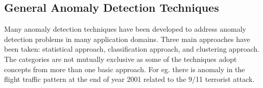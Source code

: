 \subsection{General Anomaly Detection Techniques}
Many anomaly detection techniques have been developed to address anomaly detection problems in many application domains. Three main approaches have been taken: statistical approach, classification approach, and clustering approach. The categories are not mutually exclusive as some of the techniques adopt concepts from more than one basic approach. 
For eg. there is anomaly in the flight traffic pattern at the end of year 2001 related to the 9/11 terrorist attack.


